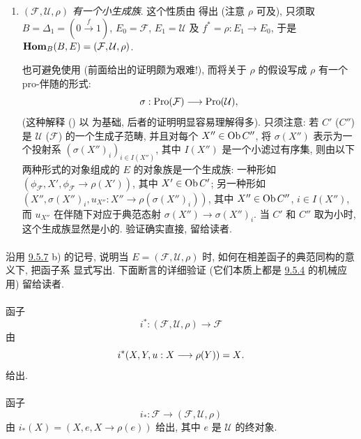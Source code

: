 \begin{enumerate}
\item $(\mathcal{F},\mathcal{U},\rho)$ \emph{有一个小生成族}.
这个性质由  得出
(注意 $\rho$ 可及), 只须取
$B=\Delta_1=(0\xrightarrow{f}1)$, $E_0=\mathcal{F}$,
$E_1=\mathcal{U}$ 及 $f^{\ast}=\rho:E_1\rightarrow E_0$,
于是 $\operatorname{\mathbf{Hom}}_B(B,E)=(\mathcal{F},\mathcal{U},\rho)$.

也可避免使用 
(前面给出的证明颇为艰难!),
而将关于 $\rho$ 的假设写成 $\rho$ 有一个 pro-伴随的形式:
$$
\sigma:\operatorname{Pro}(\mathcal{F})\longrightarrow\operatorname{Pro}(\mathcal{U}){},
$$
(这种\pageoriginale 解释 ()
以  为基础, 后者的证明明显容易理解得多).
只须注意: 若 $C'$ (\resp $C''$) 是 $\mathcal{U}$
(\resp $\mathcal{F}$) 的一个生成子范畴,
并且对每个 $X''\in\operatorname{Ob} C''$,
将 $\sigma(X'')$ 表示为一个投射系 $(\sigma(X'')_i)_{i\in I(X'')}$,
其中 $I(X'')$ 是一个小滤过有序集,
则由以下两种形式的对象组成的 $E$ 的对象族是一个生成族:
一种形如 $(\phi_{\mathcal{F}},X',\phi_{\mathcal{F}}\rightarrow\rho(X'))$,
其中 $X'\in\operatorname{Ob} C'$;
另一种形如 $(X'',\sigma(X'')_i,u_{X''}:X''\rightarrow\rho(\sigma(X'')_i))$,
其中 $X''\in\operatorname{Ob} C''$, $i\in I(X'')$,
而 $u_{X''}$ 在伴随下对应于典范态射 $\sigma(X'')\rightarrow\sigma(X'')_i$.
当 $C'$ 和 $C''$ 取为小时, 这个生成族显然是小的.
验证确实直接, 留给读者.
\end{enumerate}

\setcounter{subsubsection}{4}\setcounter{paragraph}{7}
\paragraph{}
沿用 \hyperlink{sga4.exp.IV.subsubsection.9.5.7}{9.5.7} b) 的记号,
说明当 $E=(\mathcal{F},\mathcal{U},\rho)$ 时,
如何在相差函子的典范同构的意义下,
把函子系  显式写出.
下面断言的详细验证
(它们本质上都是 \hyperref[IV.theo9.5.4]{9.5.4} 的机械应用) 留给读者.

\setcounter{subsubsection}{8}\setcounter{paragraph}{0}
\paragraph{}
函子
$$
i^{\ast}:(\mathcal{F},\mathcal{U},\rho)\longrightarrow\mathcal{F}
$$
由
$$
i^{\ast}(X,Y,u:X\longrightarrow\rho(Y))=X{}.
$$
给出.

\paragraph{}
函子
$$
i_{\ast}:\mathcal{F}\longrightarrow(\mathcal{F},\mathcal{U},\rho)
$$
由 $i_{\ast}(X)=(X,e,X\rightarrow\rho(e))$ 给出,
其中 $e$ 是 $\mathcal{U}$ 的终对象.


